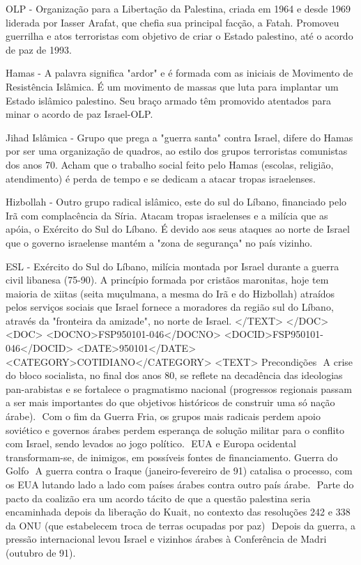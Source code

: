 OLP - Organização para a Libertação da Palestina, criada em 1964 e desde 1969 liderada por Iasser Arafat, que chefia sua principal facção, a Fatah. Promoveu guerrilha e atos terroristas com objetivo de criar o Estado palestino, até o acordo de paz de 1993.

Hamas - A palavra significa "ardor" e é formada com as iniciais de Movimento de Resistência Islâmica. É um movimento de massas que luta para implantar um Estado islâmico palestino. Seu braço armado têm promovido atentados para minar o acordo de paz Israel-OLP.

Jihad Islâmica - Grupo que prega a "guerra santa" contra Israel, difere do Hamas por ser uma organização de quadros, ao estilo dos grupos terroristas comunistas dos anos 70. Acham que o trabalho social feito pelo Hamas (escolas, religião, atendimento) é perda de tempo e se dedicam a atacar tropas israelenses.

Hizbollah - Outro grupo radical islâmico, este do sul do Líbano, financiado pelo Irã com complacência da Síria. Atacam tropas israelenses e a milícia que as apóia, o Exército do Sul do Líbano. É devido aos seus ataques ao norte de Israel que o governo israelense mantém a "zona de segurança" no país vizinho.

ESL - Exército do Sul do Líbano, milícia montada por Israel durante a guerra civil libanesa (75-90). A princípio formada por cristãos maronitas, hoje tem maioria de xiitas (seita muçulmana, a mesma do Irã e do Hizbollah) atraídos pelos serviços sociais que Israel fornece a moradores da região sul do Líbano, através da "fronteira da amizade", no norte de Israel.
</TEXT>
</DOC>
<DOC>
<DOCNO>FSP950101-046</DOCNO>
<DOCID>FSP950101-046</DOCID>
<DATE>950101</DATE>
<CATEGORY>COTIDIANO</CATEGORY>
<TEXT>
Precondições
 A crise do bloco socialista, no final dos anos 80, se reflete na decadência das ideologias pan-arabistas e se fortalece o pragmatismo nacional (progressos regionais passam a ser mais importantes do que objetivos históricos de construir uma só nação árabe).
 Com o fim da Guerra Fria, os grupos mais radicais perdem apoio soviético e governos árabes perdem esperança de solução militar para o conflito com Israel, sendo levados ao jogo político.
 EUA e Europa ocidental transformam-se, de inimigos, em possíveis fontes de financiamento.
Guerra do Golfo  A guerra contra o Iraque (janeiro-fevereiro de 91) catalisa o processo, com os EUA lutando lado a lado com países árabes contra outro país árabe.
 Parte do pacto da coalizão era um acordo tácito de que a questão palestina seria encaminhada depois da liberação do Kuait, no contexto das resoluções 242 e 338 da ONU (que estabelecem troca de terras ocupadas por paz)
 Depois da guerra, a pressão internacional levou Israel e vizinhos árabes à Conferência de Madri (outubro de 91).

